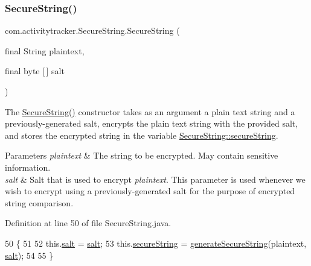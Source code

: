 \subsubsection{\texorpdfstring{Secure\+String()}{SecureString()}\hspace{0.1cm}{\footnotesize\ttfamily [2/2]}}
{\footnotesize\ttfamily com.\+activitytracker.\+Secure\+String.\+Secure\+String (\begin{DoxyParamCaption}\item[{final String}]{plaintext,  }\item[{final byte \mbox{[}$\,$\mbox{]}}]{salt }\end{DoxyParamCaption})\hspace{0.3cm}{\ttfamily [package]}}

The \mbox{\hyperlink{classcom_1_1activitytracker_1_1_secure_string_a889fcbf0c1f771962ac81886f49e389e}{Secure\+String()}} constructor takes as an argument a plain text string and a previously-\/generated salt, encrypts the plain text string with the provided salt, and stores the encrypted string in the variable \mbox{\hyperlink{classcom_1_1activitytracker_1_1_secure_string_a1448f7b8865c6c57cc7218662ee7f1ee}{Secure\+String\+::secure\+String}}.


\begin{DoxyParams}{Parameters}
{\em plaintext} & The string to be encrypted. May contain sensitive information. \\
\hline
{\em salt} & Salt that is used to encrypt {\itshape plaintext}. This parameter is used whenever we wish to encrypt using a previously-\/generated salt for the purpose of encrypted string comparison. \\
\hline
\end{DoxyParams}


Definition at line 50 of file Secure\+String.\+java.


\begin{DoxyCode}
50                                                             \{
51 
52         this.\mbox{\hyperlink{classcom_1_1activitytracker_1_1_secure_string_a8549ead1f186ff0c2520818b03d1cc21}{salt}} = \mbox{\hyperlink{classcom_1_1activitytracker_1_1_secure_string_a8549ead1f186ff0c2520818b03d1cc21}{salt}};
53         this.\mbox{\hyperlink{classcom_1_1activitytracker_1_1_secure_string_a1448f7b8865c6c57cc7218662ee7f1ee}{secureString}} = \mbox{\hyperlink{classcom_1_1activitytracker_1_1_secure_string_aa2521591ab15fb4c5a2461c04b08320f}{generateSecureString}}(plaintext, 
      \mbox{\hyperlink{classcom_1_1activitytracker_1_1_secure_string_a8549ead1f186ff0c2520818b03d1cc21}{salt}});
54 
55     \}
\end{DoxyCode}


